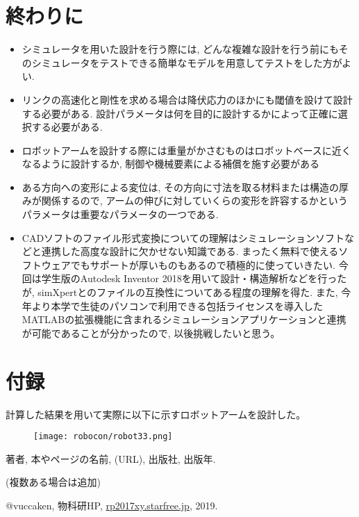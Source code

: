 \documentclass[10pt,b5paper,papersize,dvipdfmx]{jsbook}
\begin{document}
\section{終わりに}
\begin{itemize}
\item シミュレータを用いた設計を行う際には, どんな複雑な設計を行う前にもそのシミュレータをテストできる簡単なモデルを用意してテストをした方がよい.
\item リンクの高速化と剛性を求める場合は降伏応力のほかにも閾値を設けて設計する必要がある. 設計パラメータは何を目的に設計するかによって正確に選択する必要がある. 
\item ロボットアームを設計する際には重量がかさむものはロボットベースに近くなるように設計するか, 制御や機械要素による補償を施す必要がある
\item ある方向への変形による変位は, その方向に寸法を取る材料または構造の厚みが関係するので, アームの伸びに対していくらの変形を許容するかというパラメータは重要なパラメータの一つである.
\item CADソフトのファイル形式変換についての理解はシミュレーションソフトなどと連携した高度な設計に欠かせない知識である. まったく無料で使えるソフトウェアでもサポートが厚いものもあるので積極的に使っていきたい. 今回は学生版のAutodesk Inventor 2018を用いて設計・構造解析などを行ったが, simXpertとのファイルの互換性についてある程度の理解を得た. また, 今年より本学で生徒のパソコンで利用できる包括ライセンスを導入したMATLABの拡張機能に含まれるシミュレーションアプリケーションと連携が可能であることが分かったので, 以後挑戦したいと思う。
\end{itemize}

\section{付録}
計算した結果を用いて実際に以下に示すロボットアームを設計した。
\begin{figure}[H]
  \centering
  \texttt{[image: robocon/robot33.png]}
\end{figure}

\begin{thebibliography}{99}
  \item 著者, 本やページの名前, (URL), 出版社, 出版年.
  \item (複数ある場合は追加)
  \item @vuccaken, 物科研HP, \url{rp2017xy.starfree.jp}, 2019.
\end{thebibliography}
\end{document}
